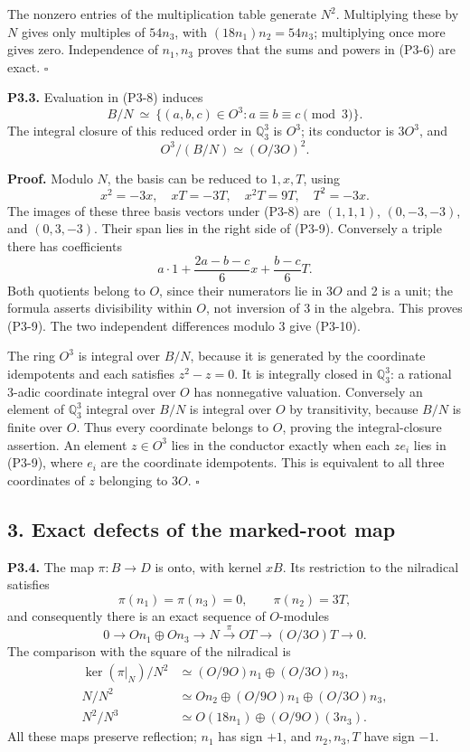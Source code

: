 \documentclass[
  10pt,
]{article}
\begin{document}
The nonzero entries of the multiplication table generate \(N^2\).
Multiplying these by \(N\) gives only multiples of \(54n_3\), with
\((18n_1)n_2=54n_3\); multiplying once more gives zero. Independence of
\(n_1,n_3\) proves that the sums and powers in (P3-6) are exact.
\(\square\)

\textbf{P3.3.} Evaluation in (P3-8) induces \[
B/N\ \simeq\ \{(a,b,c)\in O^3:a\equiv b\equiv c\pmod3\}.
\tag{P3-9}
\] The integral closure of this reduced order in \(\mathbb Q_3^3\) is
\(O^3\); its conductor is \(3O^3\), and \[
O^3/(B/N)\simeq (O/3O)^2.
\tag{P3-10}
\]

\textbf{Proof.} Modulo \(N\), the basis can be reduced to \(1,x,T\),
using \[
x^2=-3x,\quad xT=-3T,\quad x^2T=9T,\quad T^2=-3x.
\] The images of these three basis vectors under (P3-8) are \((1,1,1)\),
\((0,-3,-3)\), and \((0,3,-3)\). Their span lies in the right side of
(P3-9). Conversely a triple there has coefficients \[
a\cdot1+\frac{2a-b-c}{6}x+\frac{b-c}{6}T.
\] Both quotients belong to \(O\), since their numerators lie in \(3O\)
and 2 is a unit; the formula asserts divisibility within \(O\), not
inversion of 3 in the algebra. This proves (P3-9). The two independent
differences modulo 3 give (P3-10).

The ring \(O^3\) is integral over \(B/N\), because it is generated by
the coordinate idempotents and each satisfies \(z^2-z=0\). It is
integrally closed in \(\mathbb Q_3^3\): a rational 3-adic coordinate
integral over \(O\) has nonnegative valuation. Conversely an element of
\(\mathbb Q_3^3\) integral over \(B/N\) is integral over \(O\) by
transitivity, because \(B/N\) is finite over \(O\). Thus every
coordinate belongs to \(O\), proving the integral-closure assertion. An
element \(z\in O^3\) lies in the conductor exactly when each \(ze_i\)
lies in (P3-9), where \(e_i\) are the coordinate idempotents. This is
equivalent to all three coordinates of \(z\) belonging to \(3O\).
\(\square\)

\subsection{3. Exact defects of the marked-root
map}\label{exact-defects-of-the-marked-root-map}

\textbf{P3.4.} The map \(\pi:B\to D\) is onto, with kernel \(xB\). Its
restriction to the nilradical satisfies \[
\pi(n_1)=\pi(n_3)=0,\qquad\pi(n_2)=3T,
\tag{P3-11}
\] and consequently there is an exact sequence of \(O\)-modules \[
0\longrightarrow On_1\oplus On_3\longrightarrow N
\xrightarrow{\ \pi\ }OT\longrightarrow (O/3O)T\longrightarrow0.
\tag{P3-12}
\] The comparison with the square of the nilradical is \[
\begin{aligned}
\ker(\pi|_N)/N^2&\simeq (O/9O)n_1\oplus(O/3O)n_3,\\
N/N^2&\simeq On_2\oplus(O/9O)n_1\oplus(O/3O)n_3,\\
N^2/N^3&\simeq O(18n_1)\oplus(O/9O)(3n_3).
\end{aligned}
\tag{P3-13}
\] All these maps preserve reflection; \(n_1\) has sign \(+1\), and
\(n_2,n_3,T\) have sign \(-1\).
\end{document}

